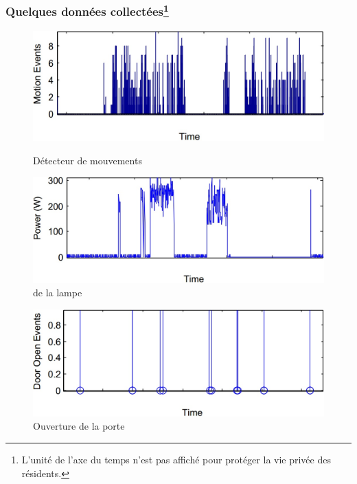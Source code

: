\def \exsca {0.21}
\begin{frame}
 \frametitle{Quelques données collectées\footnote{L'unité de l'axe du temps n'est pas affiché pour protéger la vie privée des résidents.}}
 \begin{figure}
  \begin{minipage}[c]{.46\linewidth}
   \includegraphics[scale=\exsca]{figures/EXmovement.jpg}
   \caption{Détecteur de mouvements}
  \end{minipage}
  \begin{minipage}[c]{.46\linewidth}
   \includegraphics[scale=\exsca]{figures/EXpower.jpg}
   \caption{\smartsocket de la lampe}
  \end{minipage}
 \end{figure}
 \begin{figure}
  \centering
  \includegraphics[scale=\exsca]{figures/EXdoor.jpg}
  \caption{Ouverture de la porte}
 \end{figure}
\end{frame}

